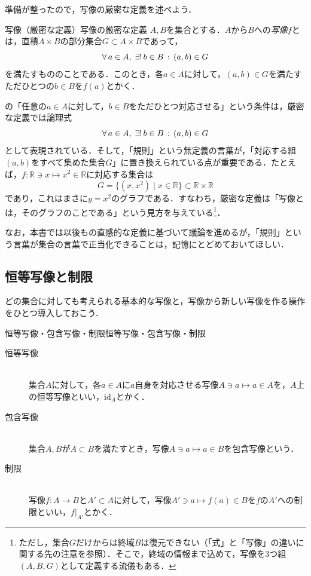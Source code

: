 準備が整ったので，写像の厳密な定義を述べよう．

\begin{definition}{写像（厳密な定義）}{写像の厳密な定義}
  $A,B$を集合とする．$A$から$B$への\emph{写像}$f$とは，直積$A \times B$の部分集合$G \subset A \times B$であって，
  \[
    \forall\, a \in A ,\; \exists!\, b \in B \,:\, (a, b) \in G
  \]
  を満たすもののことである．このとき，各$a \in A$に対して，$(a, b) \in G$を満たすただひとつの$b \in B$を$f(a)$とかく．
\end{definition}

\begin{remark}[ふたつの定義の関係]
  の「任意の$a \in A$に対して，$b \in B$をただひとつ対応させる」という条件は，厳密な定義では論理式
  \[
    \forall\, a \in A ,\; \exists!\, b \in B \,:\, (a, b) \in G
  \]
  として表現されている．そして，「規則」という無定義の言葉が，「対応する組$(a, b)$をすべて集めた集合$G$」に置き換えられている点が重要である．たとえば，$f \colon \mathbb{R} \ni x \mapsto x^2 \in \mathbb{R}$に対応する集合は
  \[
    G = \{ (x, x^2) \mid x \in \mathbb{R} \} \subset \mathbb{R} \times \mathbb{R}
  \]
  であり，これはまさに$y = x^2$のグラフである．すなわち，厳密な定義は「写像とは，そのグラフのことである」という見方を与えている\footnote{ただし，集合$G$だけからは終域$B$は復元できない（「式」と「写像」の違いに関する先の注意を参照）．そこで，終域の情報まで込めて，写像を3つ組$(A, B, G)$として定義する流儀もある．}．
\end{remark}

なお，本書では以後もの直感的な定義に基づいて議論を進めるが，「規則」という言葉が集合の言葉で正当化できることは，記憶にとどめておいてほしい．

\subsection{恒等写像と制限}

どの集合に対しても考えられる基本的な写像と，写像から新しい写像を作る操作をひとつ導入しておこう．

\begin{definition}{恒等写像・包含写像・制限}{恒等写像・包含写像・制限}
  \begin{description}
    \item[恒等写像]\mbox{}\\
          集合$A$に対して，各$a \in A$に$a$自身を対応させる写像$A \ni a \mapsto a \in A$を，$A$上の恒等写像といい，$\mathrm{id}_A$とかく．
    \item[包含写像]\mbox{}\\
          集合$A,B$が$A \subset B$を満たすとき，写像$A \ni a \mapsto a \in B$を包含写像という．
    \item[制限]\mbox{}\\
          写像$f \colon A \to B$と$A' \subset A$に対して，写像$A' \ni a \mapsto f(a) \in B$を$f$の$A'$への制限といい，$f|_{A'}$とかく．
  \end{description}
\end{definition}

